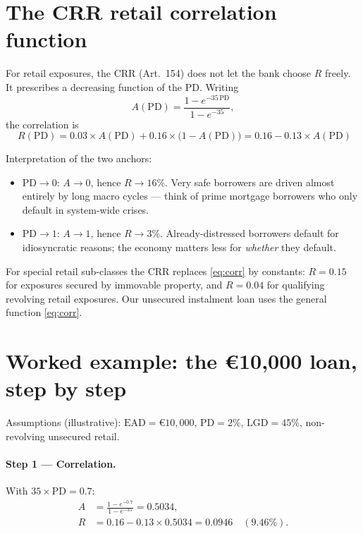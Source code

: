 \documentclass[11pt,a4paper]{report}
\renewcommand{\EUR}[1]{\euro#1}
\theoremstyle{definition}
\theoremstyle{plain}
\newcommand{\PD}{\mathrm{PD}}
\newcommand{\LGD}{\mathrm{LGD}}
\newcommand{\EAD}{\mathrm{EAD}}
\begin{document}
\section{The CRR retail correlation function}

For retail exposures, the CRR (Art.~154) does not let the bank choose
$R$ freely. It prescribes a decreasing function of the PD. Writing
\begin{equation}
  A(\PD)=\frac{1-e^{-35\,\PD}}{1-e^{-35}},
\end{equation}
the correlation is
\begin{equation}
  \boxed{\;
  R(\PD)=0.03\times A(\PD)+0.16\times\bigl(1-A(\PD)\bigr)
        =0.16-0.13\times A(\PD)}
  \label{eq:corr}
\end{equation}

Interpretation of the two anchors:

\begin{itemize}
\item $\PD\to 0$: $A\to 0$, hence $R\to 16\%$. Very safe borrowers are
      driven almost entirely by long macro cycles --- think of prime
      mortgage borrowers who only default in system-wide crises.
\item $\PD\to 1$: $A\to 1$, hence $R\to 3\%$. Already-distressed
      borrowers default for idiosyncratic reasons; the economy matters
      less for \emph{whether} they default.
\end{itemize}

For special retail sub-classes the CRR replaces \eqref{eq:corr} by
constants: $R=0.15$ for exposures secured by immovable property, and
$R=0.04$ for qualifying revolving retail exposures. Our unsecured
instalment loan uses the general function \eqref{eq:corr}.

\section{Worked example: the \texorpdfstring{\EUR{10{,}000}}{10000} loan, step by step}
\label{sec:workedA}

Assumptions (illustrative): $\EAD=\EUR{10{,}000}$, $\PD=2\%$,
$\LGD=45\%$, non-revolving unsecured retail.

\paragraph{Step 1 --- Correlation.}
With $35\times\PD = 0.7$:
\begin{align}
  A &= \frac{1-e^{-0.7}}{1-e^{-35}}=0.5034,\\
  R &= 0.16-0.13\times 0.5034 = 0.0946 \quad(9.46\%).
\end{align}
\end{document}
